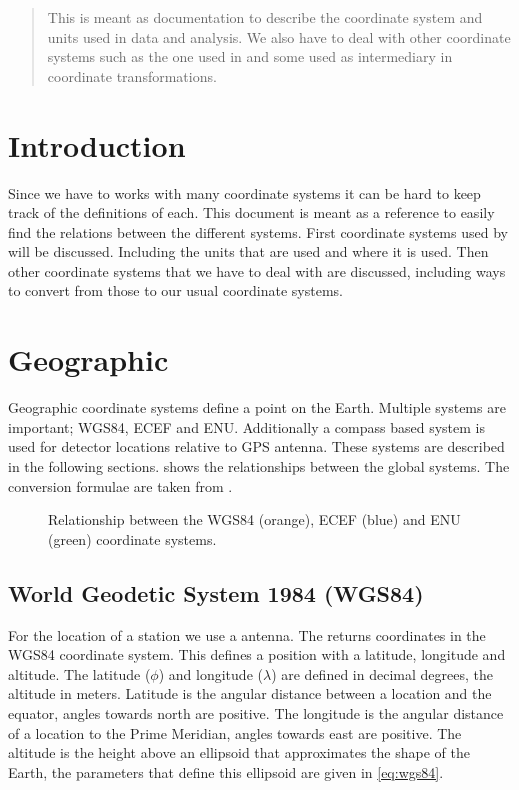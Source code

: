 \begin{abstract}

This is meant as documentation to describe the coordinate system and
units used in \hisparc data and analysis. We also have to deal with
other coordinate systems such as the one used in \corsika and some used
as intermediary in coordinate transformations.

\end{abstract}


\section{Introduction}

Since we have to works with many coordinate systems it can be hard to
keep track of the definitions of each. This document is meant as a
reference to easily find the relations between the different systems.
First coordinate systems used by \hisparc will be discussed. Including
the units that are used and where it is used. Then other coordinate
systems that we have to deal with are discussed, including ways to
convert from those to our usual coordinate systems.


\section{Geographic}

Geographic coordinate systems define a point on the Earth. Multiple
systems are important; WGS84, ECEF and ENU. Additionally a compass based
system is used for detector locations relative to GPS antenna. These
systems are described in the following sections.
 shows the relationships between the global
systems. The conversion formulae are taken from \cite{wikigeodetic}.

\begin{figure}
    \centering
    
    \caption{Relationship between the WGS84 (orange), ECEF (blue) and ENU
             (green) coordinate systems.}
    \label{fig:wgs84_ecef_enu}
\end{figure}


\subsection{World Geodetic System 1984 (WGS84)}

For the location of a station we use a \gps antenna. The \gps returns
coordinates in the WGS84 coordinate system. This defines a position with
a latitude, longitude and altitude. The latitude ($\phi$) and longitude
($\lambda$) are defined in decimal degrees, the altitude in meters.
Latitude is the angular distance between a location and the equator,
angles towards north are positive. The longitude is the angular distance
of a location to the Prime Meridian, angles towards east are positive.
The altitude is the height above an ellipsoid that approximates the
shape of the Earth, the parameters that define this ellipsoid are given
in \eqref{eq:wgs84}.


